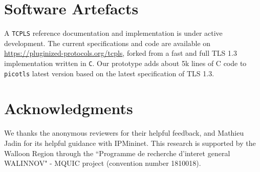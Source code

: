%


\section*{Software Artefacts}

A \texttt{TCPLS} reference documentation and implementation is under active development. The
current specifications and code are available on
\url{https://pluginized-protocols.org/tcpls}, forked from a fast and
full TLS 1.3 implementation written in \texttt{C}. Our \tcpls prototype adds
about 5k lines of C code to \texttt{picotls} latest version based on the latest
specification of TLS 1.3.

\section*{Acknowledgments}
We thanks the anonymous reviewers for their helpful feedback, and Mathieu Jadin
for its helpful guidance with IPMininet. This research is supported by the Walloon
Region through the ``Programme de recherche d'interet general
 WALINNOV" - MQUIC project (convention number 1810018).

